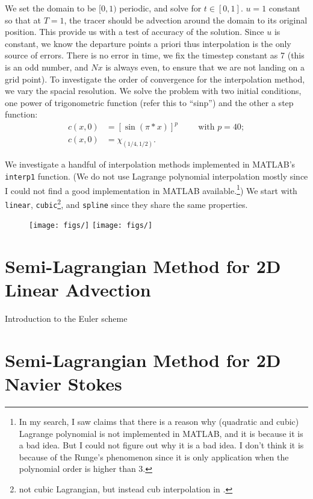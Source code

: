 \documentclass[11pt,letterpaper]{article}
\begin{document}
We set the domain to be $[0,1)$ periodic, and solve for $t\in [0,1]$. $u = 1$ constant so that at $T = 1$, the tracer should be advection around the domain to its original position. This provide us with a test of accuracy of the solution. Since $u$ is constant, we know the departure points a priori thus interpolation is the only source of errors. There is no error in time, we fix the timestep constant as 7 (this is an odd number, and $Nx$ is always even, to ensure that we are not landing on a grid point). To investigate the order of convergence for the interpolation method, we vary the spacial resolution. We solve the problem with two initial conditions, one power of trigonometric function (refer this to ``sinp'') and the other a step function:
\begin{align*}
    c(x,0) &= [\sin(\pi*x)]^p \hspace{1cm}\text{with }p = 40;\\
    c(x,0) &= \chi_{(1/4,1/2)}.
\end{align*}

We investigate a handful of interpolation methods implemented in MATLAB's \texttt{interp1} function. (We do not use Lagrange polynomial interpolation mostly since I could not find a good implementation in MATLAB available.\footnote{In my search, I saw claims that there is a reason why (quadratic and cubic) Lagrange polynomial is not implemented in MATLAB, and it is because it is a bad idea. But I could not figure out why it is a bad idea. I don't think it is because of the Runge's phenomenon since it is only application when the polynomial order is higher than 3.}) We start with \texttt{linear}, \texttt{cubic}\footnote{not cubic Lagrangian, but instead cub interpolation in \cite{keys_cubic_1981}.}, and \texttt{spline} since they share the same properties.
\begin{figure}[H]
    \centering
    \texttt{[image: figs/]}
    \texttt{[image: figs/]}
    \caption{}\label{fig:}
\end{figure}



\section{Semi-Lagrangian Method for 2D Linear Advection}\label{sec:linear_adv}
Introduction to the Euler scheme




\section{Semi-Lagrangian Method for 2D Navier Stokes}\label{sec:nonli_adv}
\end{document}
